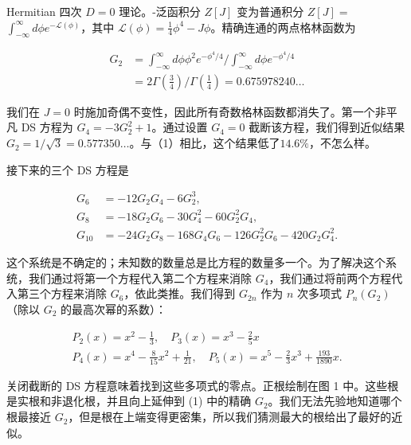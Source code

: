 \documentclass[UTF8]{ctexart}
\begin{document}
Hermitian 四次 \( D=0 \) 理论。-泛函积分 \( Z[J] \) 变为普通积分 \( Z[J]= \) \( \int_{-\infty}^{\infty} d \phi e^{-\mathcal{L}(\phi)} \)，其中 \( \mathcal{L}(\phi)=\frac{1}{4} \phi^{4}-J \phi \)。精确连通的两点格林函数为




\[
\begin{aligned}
G_{2} & =\int_{-\infty}^{\infty} d \phi \phi^{2} e^{-\phi^{4} / 4} / \int_{-\infty}^{\infty} d \phi e^{-\phi^{4} / 4} \\
& =2 \Gamma\left(\frac{3}{4}\right) / \Gamma\left(\frac{1}{4}\right)=0.675978240 \ldots
\end{aligned}
\]


我们在 \( J=0 \) 时施加奇偶不变性，因此所有奇数格林函数都消失了。第一个非平凡 DS 方程为 \( G_{4}=-3 G_{2}^{2}+1 \)。通过设置 \( G_{4}=0 \) 截断该方程，我们得到近似结果 \( G_{2}=1 / \sqrt{3}=0.577350 \ldots \)。与（1）相比，这个结果低了\( 14.6 \% \)，不怎么样。


接下来的三个 DS 方程是




\[
\begin{aligned}
G_{6} & =-12 G_{2} G_{4}-6 G_{2}^{3}, \\
G_{8} & =-18 G_{2} G_{6}-30 G_{4}^{2}-60 G_{2}^{2} G_{4}, \\
G_{10} & =-24 G_{2} G_{8}-168 G_{4} G_{6}-126 G_{2}^{2} G_{6}-420 G_{2} G_{4}^{2} .
\end{aligned}
\]




这个系统是不确定的；未知数的数量总是比方程的数量多一个。为了解决这个系统，我们通过将第一个方程代入第二个方程来消除 \( G_{4} \)，我们通过将前两个方程代入第三个方程来消除 \( G_{6} \)，依此类推。我们得到 \( G_{2 n} \) 作为 \( n \) 次多项式 \( P_{n}\left(G_{2}\right) \)（除以 \( G_{2} \) 的最高次幂的系数）：




\[
\begin{array}{l}
P_{2}(x)=x^{2}-\frac{1}{3}, \quad P_{3}(x)=x^{3}-\frac{2}{5} x \\
P_{4}(x)=x^{4}-\frac{8}{15} x^{2}+\frac{1}{21}, \quad P_{5}(x)=x^{5}-\frac{2}{3} x^{3}+\frac{193}{1890} x .
\end{array}
\]


关闭截断的 DS 方程意味着找到这些多项式的零点。正根绘制在图 1 中。这些根是实根和非退化根，并且向上延伸到 (1) 中的精确 \( G_{2} \)。我们无法先验地知道哪个根最接近 \( G_{2} \)，但是根在上端变得更密集，所以我们猜测最大的根给出了最好的近似。
\end{document}
